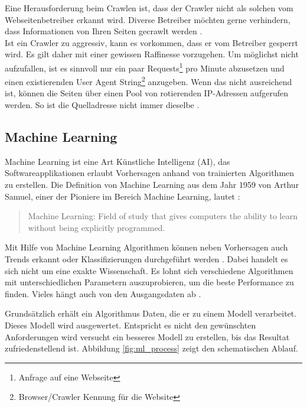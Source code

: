 %
Eine Herausforderung beim Crawlen ist, dass der Crawler nicht als solchen vom Webseitenbetreiber erkannt wird. Diverse Betreiber möchten gerne verhindern, dass Informationen von Ihren Seiten gecrawlt werden \cite{comparis}.\\
Ist ein Crawler zu aggressiv, kann es vorkommen, dass er vom Betreiber gesperrt wird. Es gilt daher mit einer gewissen Raffinesse vorzugehen. Um möglichst nicht aufzufallen, ist es sinnvoll nur ein paar Requests\footnote{Anfrage auf eine Webseite} pro Minute abzusetzen und einen existierenden User Agent String\footnote{Browser/Crawler Kennung für die Website} anzugeben. Wenn das nicht ausreichend ist, können die Seiten über einen Pool von rotierenden IP-Adressen aufgerufen werden. So ist die Quelladresse nicht immer dieselbe \cite{offensive_crawling}.
%
\subsection{Machine Learning}
Machine Learning ist eine Art Künstliche Intelligenz (AI), das Softwareapplikationen erlaubt Vorhersagen anhand von trainierten Algorithmen zu erstellen.
Die Definition von Machine Learning aus dem Jahr 1959 von Arthur Samuel, einer der Pioniere im Bereich Machine Learning, lautet \cite{what_is_ml}:
  \begin{quote}
    Machine Learning: Field of study that gives computers the ability to learn without being explicitly programmed.
  \end{quote}
Mit Hilfe von Machine Learning Algorithmen können neben Vorhersagen auch Trends erkannt oder Klassifizierungen durchgeführt werden \cite{ml_book}.
Dabei handelt es sich nicht um eine exakte Wissenschaft. Es lohnt sich verschiedene Algorithmen mit unterschiedlichen Parametern auszuprobieren, um die beste Performance zu finden. Vieles hängt auch von den Ausgangsdaten ab \cite{ml_azure}.

Grundsätzlich erhält ein Algorithmus Daten, die er zu einem Modell verarbeitet. Dieses Modell wird ausgewertet. Entspricht es nicht den gewünschten Anforderungen wird versucht ein besseres Modell zu erstellen, bis das Resultat zufriedenstellend ist. Abbildung \ref{fig:ml_process} zeigt den schematischen Ablauf.\\


